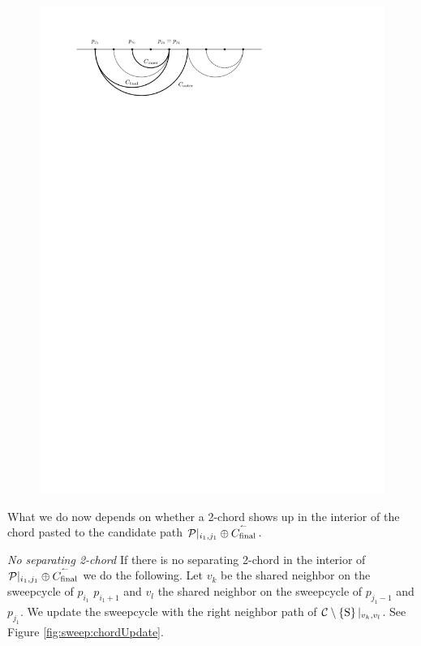     \begin{figure}[h]
      \centering
      \includegraphics[scale=1]{unifiedalgo/img/sweep/chordsOnCandidatePath}
      \caption{}
      \label{fig:sweep:chordsOnCandidatePath}
    \end{figure}

    What we do now depends on whether a 2-chord shows up in the interior of the chord pasted to the candidate path $\mathcal{P}|_{i_1, j_1} \oplus \accentset{\leftharpoonup}{{C_\text{final}}}$.

    \emph{No separating 2-chord}
    If there is no separating 2-chord in the interior of $\mathcal{P}|_{i_1, j_1} \oplus \accentset{\leftharpoonup}{{C_\text{final}}}$ we do the following. Let $v_k$ be the shared neighbor on the sweepcycle of $p_{i_1}$ $p_{i_1 +1}$ and $v_l$ the shared neighbor on the sweepcycle  of $p_{j_1 -1}$ and $p_{j_1}$. We update the sweepcycle with the right neighbor path of $\mathcal{C} \setminus \left\lbrace {\mathrm{S}} \right\rbrace|_{v_k, v_l}$. See Figure \ref{fig:sweep:chordUpdate}.

